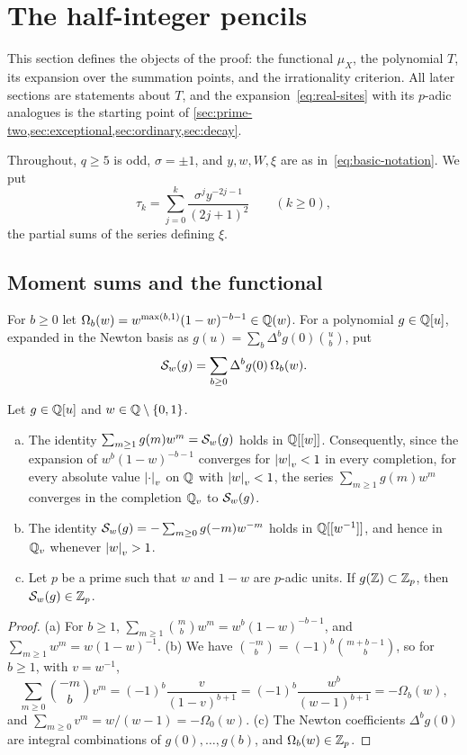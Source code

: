 \section{The half-integer pencils}\label{sec:pencils}

This section defines the objects of the proof: the functional $\mu_X$, the polynomial $T$, its
expansion over the summation points, and the irrationality criterion. All later sections are
statements about $T$, and the expansion~\eqref{eq:real-sites} with its $p$-adic analogues is the
starting point of \cref{sec:prime-two,sec:exceptional,sec:ordinary,sec:decay}.

Throughout, $q\ge5$ is odd, $\sigma=\pm1$, and $y,w,W,\xi$ are as
in~\eqref{eq:basic-notation}. We put
\begin{equation}\label{eq:tau}
  \tau_k=\sum_{j=0}^{k}\frac{\sigma^jy^{-2j-1}}{(2j+1)^2}\qquad(k\ge0),
\end{equation}
the partial sums of the series defining $\xi$.

\subsection{Moment sums and the functional}\label{subsec:moment-sums}

For $b\ge0$ let $\Omega_b(w)=w^{\max(b,1)}(1-w)^{-b-1}\in\mathbb{Q}(w)$. For a polynomial $g\in\mathbb{Q}[u]$,
expanded in the Newton basis as $g(u)=\sum_b\Delta^bg(0)\binom ub$, put
\[
  \mathcal{S}_w(g)=\sum_{b\ge0}\Delta^bg(0)\,\Omega_b(w).
\]

\begin{lemma}\label{lem:moment-sums}
Let $g\in\mathbb{Q}[u]$ and $w\in\mathbb{Q}\setminus\{0,1\}$.
\begin{enumerate}[(a)]
\item The identity $\sum_{m\ge1}g(m)w^m=\mathcal{S}_w(g)$ holds in $\mathbb{Q}[[w]]$. Consequently, since the expansion of
$w^b(1-w)^{-b-1}$ converges for $\left\lvert w\right\rvert_v<1$ in every completion, for every
absolute value $\left\lvert \cdot\right\rvert_v$ on $\mathbb{Q}$ with $\left\lvert w\right\rvert_v<1$, the series $\sum_{m\ge1}g(m)w^m$
converges in the completion $\mathbb{Q}_v$ to $\mathcal{S}_w(g)$.
\item The identity $\mathcal{S}_w(g)=-\sum_{m\ge0}g(-m)w^{-m}$ holds in $\mathbb{Q}[[w^{-1}]]$, and hence in
$\mathbb{Q}_v$ whenever $\left\lvert w\right\rvert_v>1$.
\item Let $p$ be a prime such that $w$ and $1-w$ are $p$-adic units. If $g(\mathbb{Z})\subset\mathbb{Z}_p$, then
$\mathcal{S}_w(g)\in\mathbb{Z}_p$.
\end{enumerate}
\end{lemma}

\begin{proof}
(a) For $b\ge1$, $\sum_{m\ge1}\binom mbw^m=w^b(1-w)^{-b-1}$, and $\sum_{m\ge1}w^m=w(1-w)^{-1}$.
(b) We have $\binom{-m}{b}=(-1)^b\binom{m+b-1}{b}$, so for $b\ge1$, with $v=w^{-1}$,
\[
 \sum_{m\ge0}\binom{-m}bv^m=(-1)^b\frac{v}{(1-v)^{b+1}}=(-1)^b\frac{w^{b}}{(w-1)^{b+1}}
 =-\Omega_b(w),
\]
and $\sum_{m\ge0}v^m=w/(w-1)=-\Omega_0(w)$. (c) The Newton coefficients $\Delta^bg(0)$ are
integral combinations of $g(0),\dots,g(b)$, and $\Omega_b(w)\in\mathbb{Z}_p$.
\end{proof}


